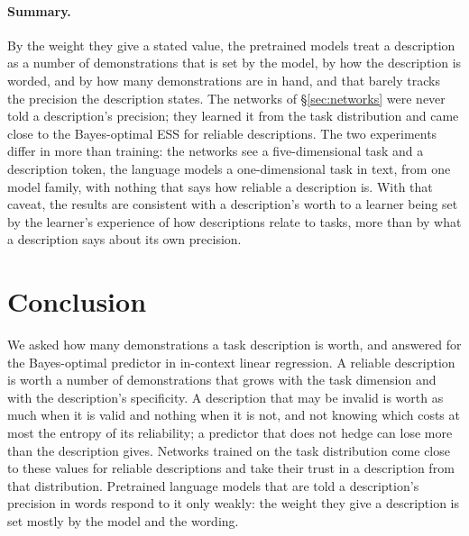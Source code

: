 \documentclass[10pt]{article}
\begin{document}
\paragraph{Summary.} By the weight they give a stated value, the pretrained models treat a description as a number of demonstrations that is set by the model, by how the description is worded, and by how many demonstrations are in hand, and that barely tracks the precision the description states. The networks of \S\ref{sec:networks} were never told a description's precision; they learned it from the task distribution and came close to the Bayes-optimal ESS for reliable descriptions. The two experiments differ in more than training: the networks see a five-dimensional task and a description token, the language models a one-dimensional task in text, from one model family, with nothing that says how reliable a description is. With that caveat, the results are consistent with a description's worth to a learner being set by the learner's experience of how descriptions relate to tasks, more than by what a description says about its own precision.

\section{Conclusion}
We asked how many demonstrations a task description is worth, and answered for the Bayes-optimal predictor in in-context linear regression. A reliable description is worth a number of demonstrations that grows with the task dimension and with the description's specificity. A description that may be invalid is worth as much when it is valid and nothing when it is not, and not knowing which costs at most the entropy of its reliability; a predictor that does not hedge can lose more than the description gives. Networks trained on the task distribution come close to these values for reliable descriptions and take their trust in a description from that distribution. Pretrained language models that are told a description's precision in words respond to it only weakly: the weight they give a description is set mostly by the model and the wording.
\end{document}
